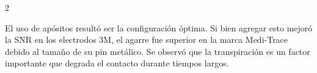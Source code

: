 \documentclass[11pt,letterpaper]{article}
\begin{document}
\begin{multicols*}{2}


El uso de  apósitos resultó ser la configuración óptima. Si bien agregar esto mejoró la SNR en los electrodos 3M, el agarre fue superior en la marca Medi-Trace debido al tamaño de su pin metálico. Se observó que la transpiración es un factor importante que degrada el contacto durante tiempos largos.

    
    
    

\end{multicols*}
\end{document}
